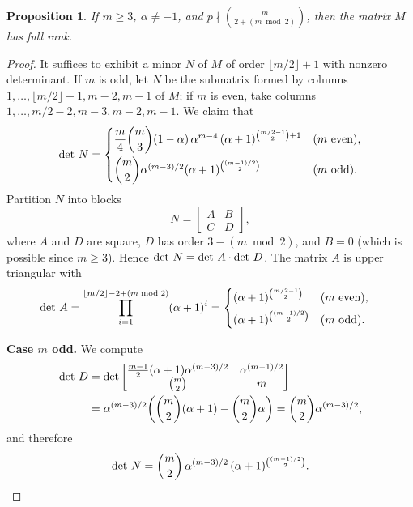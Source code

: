\documentclass[12pt]{amsart}
\newtheorem{proposition}[theorem]{Proposition}
\theoremstyle{remark}
\theoremstyle{definition}
\def\det{{\rm det}}
\begin{document}
\begin{proposition}\label{rank-M}
    If $m \ge 3$, $\alpha \neq -1$, and 
    $p \nmid \binom{m}{2 + (m \bmod 2)}$, then the matrix $M$ has full rank.
\end{proposition}

\begin{proof}
    It suffices to exhibit a minor $N$ of $M$ of order $\lfloor m/2 \rfloor + 1$ 
    with nonzero determinant. If $m$ is odd, let $N$ be the submatrix formed 
    by columns $1, \ldots, \lfloor m/2 \rfloor - 1, m-2, m-1$ of $M$; if $m$ 
    is even, take columns $1, \ldots, m/2 - 2, m-3, m-2, m-1$. We claim that
    \[
        \det~N = \begin{cases}
            \dfrac{m}{4}\dbinom{m}{3}
            (1-\alpha)\,\alpha^{m-4}\,(\alpha+1)^{\binom{m/2-1}{2}+1} 
            & (m \text{ even}), \\[8pt]
            \dbinom{m}{2}\alpha^{(m-3)/2}(\alpha+1)^{\binom{(m-1)/2}{2}} 
            & (m \text{ odd}).
        \end{cases}
    \]
    Partition $N$ into blocks
    \[
        N = \begin{bmatrix} A & B \\ C & D \end{bmatrix},
    \]
    where $A$ and $D$ are square, $D$ has order $3 - (m \bmod 2)$, and 
    $B = 0$ (which is possible since $m \ge 3$). Hence 
    $\det~N = \det~A \cdot \det~D$. The matrix $A$ is upper triangular with
    \begin{align*}
        \det~A 
        &= \prod_{i=1}^{\lfloor m/2 \rfloor - 2 + (m \bmod 2)} (\alpha+1)^i 
        = \begin{cases}
            (\alpha+1)^{\binom{m/2-1}{2}} & (m \text{ even}), \\[4pt]
            (\alpha+1)^{\binom{(m-1)/2}{2}} & (m \text{ odd}).
        \end{cases}
    \end{align*}

    \noindent\textbf{Case $m$ odd.} We compute
    \begin{align*}
        \det~D 
        &= \det\begin{bmatrix}
            \frac{m-1}{2}(\alpha+1)\alpha^{(m-3)/2} & \alpha^{(m-1)/2} \\
            \binom{m}{2} & m
        \end{bmatrix} \\
        &= \alpha^{(m-3)/2}\!\left(\binom{m}{2}(\alpha+1) - \binom{m}{2}\alpha\right) 
        = \binom{m}{2}\alpha^{(m-3)/2},
    \end{align*}
    and therefore
    \[
        \det~N = \binom{m}{2}\,\alpha^{(m-3)/2}\,(\alpha+1)^{\binom{(m-1)/2}{2}}.
    \]


\end{proof}
\end{document}
